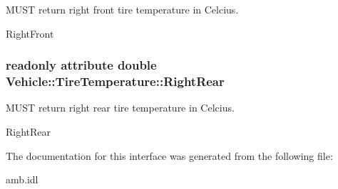 M\-U\-S\-T return right front tire temperature in Celcius. 

Right\-Front \hypertarget{interfaceVehicle_1_1TireTemperature_a93b9ac302c47e510aa8c3a14687f6bf6}{
\subsubsection[{Right\-Rear}]{\setlength{\rightskip}{0pt plus 5cm}readonly attribute double Vehicle\-::\-Tire\-Temperature\-::\-Right\-Rear}}\label{interfaceVehicle_1_1TireTemperature_a93b9ac302c47e510aa8c3a14687f6bf6}


M\-U\-S\-T return right rear tire temperature in Celcius. 

Right\-Rear 

The documentation for this interface was generated from the following file\-:\begin{DoxyCompactItemize}
\item 
amb.\-idl\end{DoxyCompactItemize}
